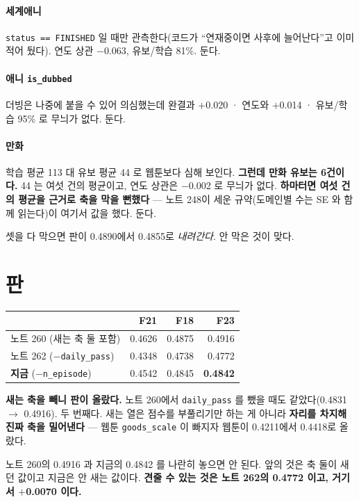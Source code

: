 \documentclass[10pt]{article}
\begin{document}
\paragraph{세계애니} \texttt{status == FINISHED} 일 때만 관측한다(코드가
``연재중이면 사후에 늘어난다''고 이미 적어 뒀다). 연도 상관 $-$0.063, 유보/학습
81\%. 둔다.

\paragraph{애니 \texttt{is\_dubbed}} 더빙은 나중에 붙을 수 있어 의심했는데
완결과 $+$0.020 · 연도와 $+$0.014 · 유보/학습 95\% 로 무늬가 없다. 둔다.

\paragraph{만화} 학습 평균 113 대 유보 평균 44 로 웹툰보다 심해 보인다.
\textbf{그런데 만화 유보는 6건이다.} 44 는 여섯 건의 평균이고, 연도 상관은
$-$0.002 로 무늬가 없다. \textbf{하마터면 여섯 건의 평균을 근거로 축을 막을
뻔했다} --- 노트 248이 세운 규약(도메인별 수는 SE 와 함께 읽는다)이 여기서
값을 했다. 둔다.

셋을 다 막으면 판이 0.4890에서 0.4855로 \emph{내려간다}. 안 막은 것이 맞다.

\section{판}

\begin{center}\small
\begin{tabular}{lrrr}
\hline
 & F21 & F18 & \textbf{F23} \\
\hline
노트 260 (새는 축 둘 포함) & 0.4626 & 0.4875 & 0.4916 \\
노트 262 ($-$\texttt{daily\_pass}) & 0.4348 & 0.4738 & 0.4772 \\
\textbf{지금} ($-$\texttt{n\_episode}) & 0.4542 & 0.4845 & \textbf{0.4842} \\
\hline
\end{tabular}
\end{center}

\textbf{새는 축을 빼니 판이 올랐다.} 노트 260에서 \texttt{daily\_pass} 를
뺐을 때도 같았다(0.4831 $\to$ 0.4916). 두 번째다. 새는 열은 점수를
부풀리기만 하는 게 아니라 \textbf{자리를 차지해 진짜 축을 밀어낸다} ---
웹툰 \texttt{goods\_scale} 이 빠지자 웹툰이 0.4211에서 0.4418로 올랐다.

노트 260의 0.4916 과 지금의 0.4842 를 나란히 놓으면 안 된다. 앞의 것은
축 둘이 새던 값이고 지금은 안 새는 값이다. \textbf{견줄 수 있는 것은 노트
262의 0.4772 이고, 거기서 $+$0.0070 이다.}
\end{document}
